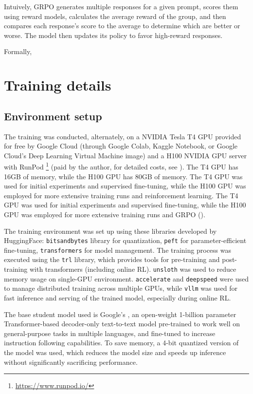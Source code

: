 Intuively, GRPO generates multiple responses for a given prompt, scores them using reward models, calculates the average reward of the group, and then compares each response's score to the average to determine which are better or worse. The model then updates its policy to favor high-reward responses.

Formally,


\section{Training details} \label{app:training-details}
\subsection{Environment setup}
The training was conducted, alternately, on a NVIDIA Tesla T4 GPU provided for free by Google Cloud (through Google Colab, Kaggle Notebook, or Google Cloud's Deep Learning Virtual Machine image) and a H100 NVIDIA GPU server with RunPod \footnote{\url{https://www.runpod.io/}} (paid by the author, for detailed costs, see ). The T4 GPU has 16GB of memory, while the H100 GPU has 80GB of memory. The T4 GPU was used for initial experiments and supervised fine-tuning, while the H100 GPU was employed for  more extensive training runs and reinforcement learning. The T4 GPU was used for initial experiments and supervised fine-tuning, while the H100 GPU was employed for more extensive training runs and GRPO ().

The training environment was set up using these libraries developed by HuggingFace: \verb|bitsandbytes| library for quantization, \verb|peft| for parameter-efficient fine-tuning, \verb|transformers| for model management. The training process was executed using the \verb|trl| library, which provides tools for pre-training and post-training with transformers (including online RL). \verb|unsloth| was used to reduce memory usage on single-GPU environment. \verb|accelerate| and \verb|deepspeed| were used to manage distributed training across multiple GPUs, while \verb|vllm| was used for fast inference and serving of the trained model, especially during online RL.

The base student model used is Google's \studentmodel, an open-weight 1-billion parameter Transformer-based decoder-only text-to-text model pre-trained to work well on general-purpose tasks in multiple languages, and fine-tuned to increase instruction following capabilities. To save memory, a 4-bit quantized version of the model was used, which reduces the model size and speeds up inference without significantly sacrificing performance.

